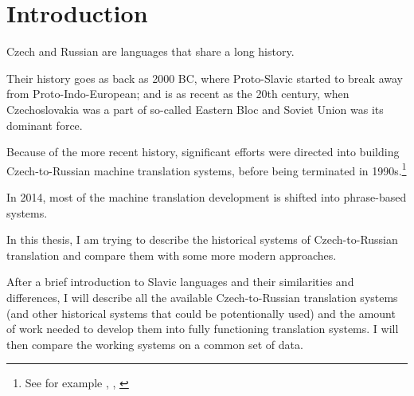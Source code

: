 \chapter*{Introduction}
Czech and Russian are languages that share a long history.

Their history goes as back as 2000 BC, where Proto-Slavic started to break away from Proto-Indo-European; and is as recent as the 20th century, when  Czechoslovakia was a part of so-called Eastern Bloc and Soviet Union was its dominant force.

Because of the more recent history,
significant efforts were directed
into building Czech-to-Russian machine translation systems, before being terminated in 1990s.\footnote{See for example \cite{recycled}, \cite{hajic1987}, \cite{olivaruslan}}

In 2014, most of the machine translation development is shifted into phrase-based systems.

In this thesis, I am trying to describe the historical systems of Czech-to-Russian translation and compare them with some more modern approaches. 

After a brief introduction to Slavic languages and their similarities and differences, I will describe all the available Czech-to-Russian translation systems (and other historical systems that could be potentionally used) and the amount of work needed to develop them into fully functioning translation systems. I will then compare the working systems on a common set of data.


